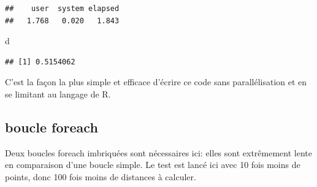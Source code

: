\documentclass[
  12pt,
  french,
  a4paper,
  extrafontsizes,onecolumn,openright
  ]{memoir}
\newenvironment{Shaded}{\begin{snugshade}}{\end{snugshade}}
\newcommand{\ControlFlowTok}[1]{\textcolor[rgb]{0.13,0.29,0.53}{\textbf{#1}}}
\newcommand{\DataTypeTok}[1]{\textcolor[rgb]{0.13,0.29,0.53}{#1}}
\newcommand{\DecValTok}[1]{\textcolor[rgb]{0.00,0.00,0.81}{#1}}
\newcommand{\KeywordTok}[1]{\textcolor[rgb]{0.13,0.29,0.53}{\textbf{#1}}}
\newcommand{\NormalTok}[1]{#1}
\newcommand{\OperatorTok}[1]{\textcolor[rgb]{0.81,0.36,0.00}{\textbf{#1}}}
\newcommand{\StringTok}[1]{\textcolor[rgb]{0.31,0.60,0.02}{#1}}
\begin{document}
\begin{verbatim}
##    user  system elapsed 
##   1.768   0.020   1.843
\end{verbatim}

\begin{Shaded}
\begin{Highlighting}[]
\NormalTok{d}
\end{Highlighting}
\end{Shaded}

\begin{verbatim}
## [1] 0.5154062
\end{verbatim}

\normalsize
C'est la façon la plus simple et efficace d'écrire ce code sans parallélisation et en se limitant au langage de R.

\hypertarget{boucle-foreach}{%
\subsection{boucle foreach}\label{boucle-foreach}}

Deux boucles foreach imbriquées sont nécessaires ici: elles sont extrêmement lente en comparaison d'une boucle simple.
Le test est lancé ici avec 10 fois moins de points, donc 100 fois moins de distances à calculer.

\scriptsize

\begin{Shaded}
\end{Shaded}
\end{document}
